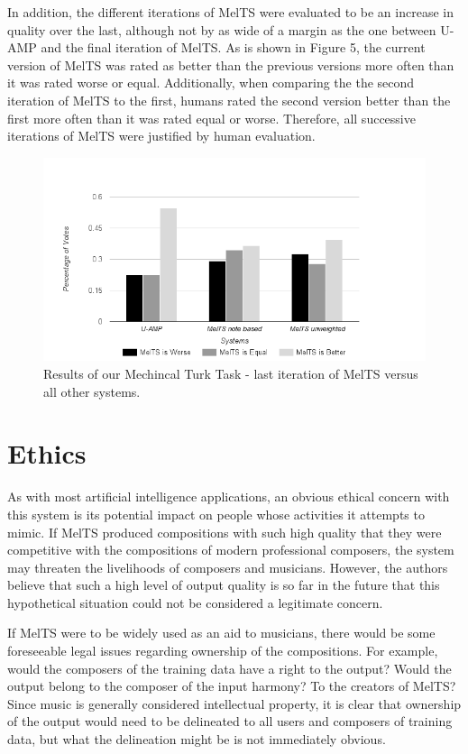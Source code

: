 \documentclass{sig-alternate}
\begin{document}
In addition, the different iterations of MelTS were evaluated to be an increase in quality over the last, although not by as wide of a margin as the one between U-AMP and the final iteration of MelTS. As is shown in Figure 5, the current version of MelTS was rated as better than the previous versions more often than it was rated worse or equal. Additionally, when comparing the the second iteration of MelTS to the first, humans rated the second version better than the first more often than it was rated equal or worse. Therefore, all successive iterations of MelTS were justified by human evaluation.

\begin{figure}
\includegraphics[scale=0.4]{mturk_results}
\caption{Results of our Mechincal Turk Task - last iteration of MelTS versus all other systems.}
\end{figure}
\label{sec:system_performance}

\section{Ethics}
As with most artificial intelligence applications, an obvious ethical concern with this system is its potential impact on people whose activities it attempts to mimic. If MelTS produced compositions with such high quality that they were competitive with the compositions of modern professional composers, the system may threaten the livelihoods of composers and musicians. However, the authors believe that such a high level of output quality is so far in the future that this hypothetical situation could not be considered a legitimate concern.

If MelTS were to be widely used as an aid to musicians, there would be some foreseeable legal issues regarding ownership of the compositions. For example, would the composers of the training data have a right to the output? Would the output belong to the composer of the input harmony? To the creators of MelTS? Since music is generally considered intellectual property, it is clear that ownership of the output would need to be delineated to all users and composers of training data, but what the delineation might be is not immediately obvious.
\label{sec:ethics}
\end{document}
